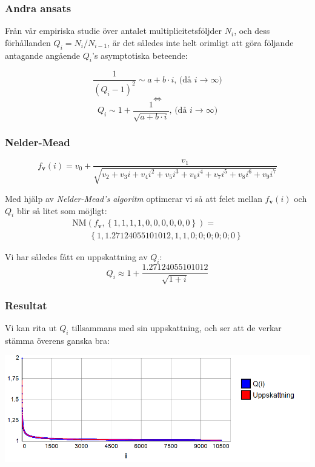 \documentclass{beamer}
\begin{document}
\begin{frame}
	\frametitle{Andra ansats}
Från vår empiriska studie över antalet multiplicitetsföljder $N_i$, och dess förhållanden $Q_i=N_i/N_{i-1}$, är det således inte helt orimligt att göra följande antagande angående $Q_i$'s asymptotiska beteende:

\[\frac{1}{\left(Q_i-1\right)^2} \sim a+b\cdot i \text{, (då $i \rightarrow \infty$)}\]
\[\Longleftrightarrow \]
\[Q_i \sim 1+\frac{1}{\sqrt{a+b\cdot i}}\text{, (då $i \rightarrow \infty$)} \]
\end{frame}

\begin{frame}
	\frametitle{Nelder-Mead}
		
	\[f_\mathbf{v}(i)=v_0+\frac{v_1}{\sqrt{v_2+v_3 i+v_4 i^2+v_5 i^3+v_6 i^4+v_7 i^5+v_8 i^6+v_9 i^7}}\]
	
	Med hjälp av \emph{Nelder-Mead's algoritm} optimerar vi så att felet mellan $f_\mathbf{v}(i)$ och $Q_i$ blir så litet som möjligt:
	\[\begin{array}{l}
	\text{NM}(f_\mathbf{v},\left\{1,1,1,1,0,0,0,0,0,0\right\})=\\
	\qquad\left\{1, 1.27124055101012, 1, 1, 0; 0; 0; 0; 0; 0\right\}\end{array}\]
	
	Vi har således fått en uppskattning av $Q_i$:
	\[Q_i \approx 1+\frac{1.27124055101012}{\sqrt{1+i}} \]	
\end{frame}

\begin{frame}
	\frametitle{Resultat}
Vi kan rita ut $Q_i$ tillsammans med sin uppskattning, och ser att de verkar stämma överens ganska bra:

\begin{center}
	\includegraphics[scale=0.5]{Export/Complexity17.png}
\end{center}
\end{frame}
\end{document}
